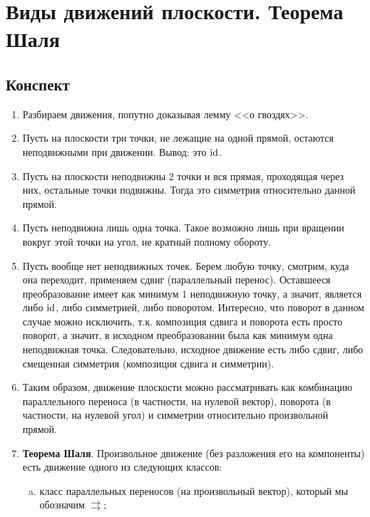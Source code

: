 
\section{Виды движений плоскости. Теорема Шаля}

\subsection*{Конспект}
\begin{enumerate}\setlength{\itemsep}{1pt}
\item Разбираем движения, попутно доказывая лемму <<о гвоздях>>.
\item Пусть на плоскости три точки, не лежащие на одной прямой, остаются неподвижными при движении. Вывод: это $\mathrm{id}$.
\item Пусть на плоскости неподвижны 2 точки и вся прямая, проходящая через них, остальные точки подвижны. Тогда это симметрия относительно данной прямой.
\item Пусть неподвижна лишь одна точка. Такое возможно лишь при вращении вокруг этой точки на угол, не кратный полному обороту.
\item Пусть вообще нет неподвижных точек. Берем любую точку, смотрим, куда она переходит, применяем сдвиг (параллельный перенос). Оставшееся преобразование имеет как минимум 1 неподвижную точку, а значит, является либо $\mathrm{id}$, либо симметрией, либо поворотом. Интересно, что поворот в данном случае можно исключить, т.к. композиция сдвига и поворота есть просто поворот, а значит, в исходном преобразовании была как минимум одна неподвижная точка. Следовательно, исходное движение есть либо сдвиг, либо смещенная симметрия (композиция сдвига и симметрии).
\item Таким образом, движение плоскости можно рассматривать как комбинацию параллельного переноса (в частности, на нулевой вектор), поворота (в частности, на нулевой угол) и симметрии относительно произвольной прямой.
\item \textbf{Теорема Шаля}. Произвольное движение (без разложения его на компоненты) есть движение одного из следующих классов:
\begin{enumerate}[a)]
\item класс параллельных переносов (на произвольный вектор), который мы обозначим $\rightrightarrows$;

\end{enumerate}
\end{enumerate}
